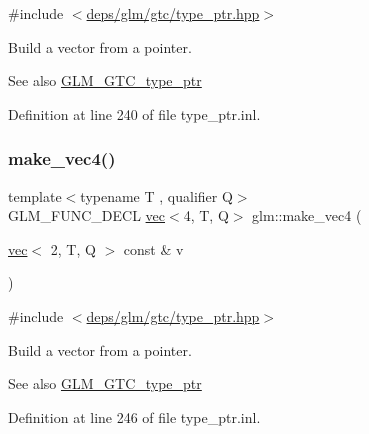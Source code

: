 {\ttfamily \#include $<$\hyperlink{type__ptr_8hpp}{deps/glm/gtc/type\+\_\+ptr.\+hpp}$>$}

Build a vector from a pointer. \begin{DoxySeeAlso}{See also}
\hyperlink{group__gtc__type__ptr}{G\+L\+M\+\_\+\+G\+T\+C\+\_\+type\+\_\+ptr} 
\end{DoxySeeAlso}


Definition at line 240 of file type\+\_\+ptr.\+inl.

\mbox{\label{group__gtc__type__ptr_gaa9bd116caf28196fd1cf00b278286fa7}} 
\subsubsection{\texorpdfstring{make\+\_\+vec4()}{make\_vec4()}\hspace{0.1cm}{\footnotesize\ttfamily [2/5]}}
{\footnotesize\ttfamily template$<$typename T , qualifier Q$>$ \\
G\+L\+M\+\_\+\+F\+U\+N\+C\+\_\+\+D\+E\+CL \hyperlink{structglm_1_1vec}{vec}$<$4, T, Q$>$ glm\+::make\+\_\+vec4 (\begin{DoxyParamCaption}\item[{\hyperlink{structglm_1_1vec}{vec}$<$ 2, T, Q $>$ const \&}]{v }\end{DoxyParamCaption})\hspace{0.3cm}{\ttfamily [inline]}}



{\ttfamily \#include $<$\hyperlink{type__ptr_8hpp}{deps/glm/gtc/type\+\_\+ptr.\+hpp}$>$}

Build a vector from a pointer. \begin{DoxySeeAlso}{See also}
\hyperlink{group__gtc__type__ptr}{G\+L\+M\+\_\+\+G\+T\+C\+\_\+type\+\_\+ptr} 
\end{DoxySeeAlso}


Definition at line 246 of file type\+\_\+ptr.\+inl.

\mbox{\label{group__gtc__type__ptr_ga4036328ba4702c74cbdfad1fc03d1b8f}} 
